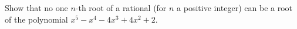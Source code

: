 Show that no one $n$-th root of a rational (for $n$ a positive integer) can be a root of the polynomial $x^5 - x^4 - 4x^3 + 4x^2 + 2$.